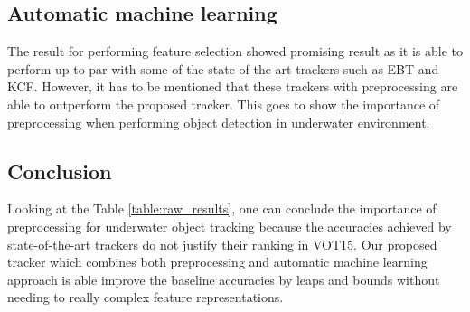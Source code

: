 \documentclass[hyp]{socreport}
\begin{document}
\subsection{Automatic machine learning}

The result for performing feature selection showed promising result as it is
able to perform up to par with some of the state of the art trackers such as EBT
and KCF. However, it has to be mentioned that these trackers with preprocessing
are able to outperform the proposed tracker. This goes to show the importance of
preprocessing when performing object detection in underwater environment.

\subsection{Conclusion}

Looking at the Table \ref{table:raw_results}, one can conclude the importance of
preprocessing for underwater object tracking because the accuracies achieved by
state-of-the-art trackers do not justify their ranking in VOT15. Our proposed
tracker which combines both preprocessing and automatic machine learning
approach is able improve the baseline accuracies by leaps and bounds without
needing to really complex feature representations.


{}

\end{document}
